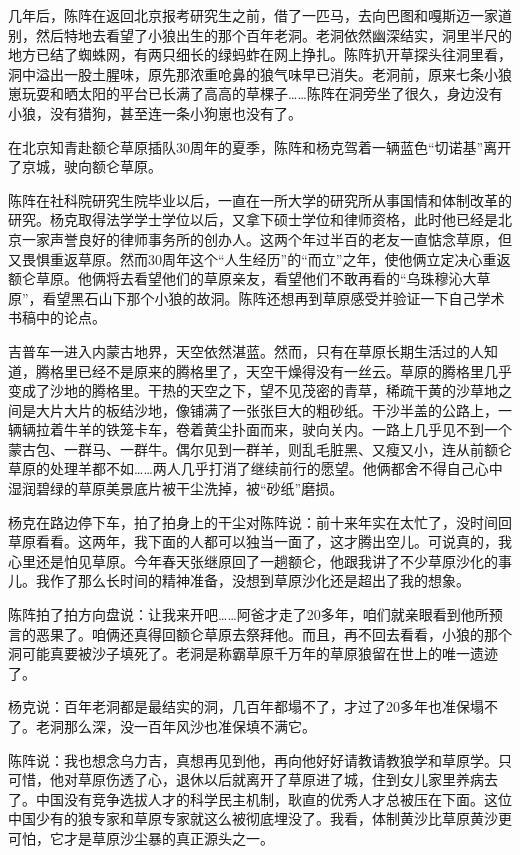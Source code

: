\par 几年后，陈阵在返回北京报考研究生之前，借了一匹马，去向巴图和嘎斯迈一家道别，然后特地去看望了小狼出生的那个百年老洞。老洞依然幽深结实，洞里半尺的地方已结了蜘蛛网，有两只细长的绿蚂蚱在网上挣扎。陈阵扒开草探头往洞里看，洞中溢出一股土腥味，原先那浓重呛鼻的狼气味早已消失。老洞前，原来七条小狼崽玩耍和晒太阳的平台已长满了高高的草棵子……陈阵在洞旁坐了很久，身边没有小狼，没有猎狗，甚至连一条小狗崽也没有了。
\par 在北京知青赴额仑草原插队30周年的夏季，陈阵和杨克驾着一辆蓝色“切诺基”离开了京城，驶向额仑草原。
\par 陈阵在社科院研究生院毕业以后，一直在一所大学的研究所从事国情和体制改革的研究。杨克取得法学学士学位以后，又拿下硕士学位和律师资格，此时他已经是北京一家声誉良好的律师事务所的创办人。这两个年过半百的老友一直惦念草原，但又畏惧重返草原。然而30周年这个“人生经历”的“而立”之年，使他俩立定决心重返额仑草原。他俩将去看望他们的草原亲友，看望他们不敢再看的“乌珠穆沁大草原”，看望黑石山下那个小狼的故洞。陈阵还想再到草原感受并验证一下自己学术书稿中的论点。
\par 吉普车一进入内蒙古地界，天空依然湛蓝。然而，只有在草原长期生活过的人知道，腾格里已经不是原来的腾格里了，天空干燥得没有一丝云。草原的腾格里几乎变成了沙地的腾格里。干热的天空之下，望不见茂密的青草，稀疏干黄的沙草地之间是大片大片的板结沙地，像铺满了一张张巨大的粗砂纸。干沙半盖的公路上，一辆辆拉着牛羊的铁笼卡车，卷着黄尘扑面而来，驶向关内。一路上几乎见不到一个蒙古包、一群马、一群牛。偶尔见到一群羊，则乱毛脏黑、又瘦又小，连从前额仑草原的处理羊都不如……两人几乎打消了继续前行的愿望。他俩都舍不得自己心中湿润碧绿的草原美景底片被干尘洗掉，被“砂纸”磨损。
\par 杨克在路边停下车，拍了拍身上的干尘对陈阵说：前十来年实在太忙了，没时间回草原看看。这两年，我下面的人都可以独当一面了，这才腾出空儿。可说真的，我心里还是怕见草原。今年春天张继原回了一趟额仑，他跟我讲了不少草原沙化的事儿。我作了那么长时间的精神准备，没想到草原沙化还是超出了我的想象。
\par 陈阵拍了拍方向盘说：让我来开吧……阿爸才走了20多年，咱们就亲眼看到他所预言的恶果了。咱俩还真得回额仑草原去祭拜他。而且，再不回去看看，小狼的那个洞可能真要被沙子填死了。老洞是称霸草原千万年的草原狼留在世上的唯一遗迹了。
\par 杨克说：百年老洞都是最结实的洞，几百年都塌不了，才过了20多年也准保塌不了。老洞那么深，没一百年风沙也准保填不满它。
\par 陈阵说：我也想念乌力吉，真想再见到他，再向他好好请教请教狼学和草原学。只可惜，他对草原伤透了心，退休以后就离开了草原进了城，住到女儿家里养病去了。中国没有竞争选拔人才的科学民主机制，耿直的优秀人才总被压在下面。这位中国少有的狼专家和草原专家就这么被彻底埋没了。我看，体制黄沙比草原黄沙更可怕，它才是草原沙尘暴的真正源头之一。
